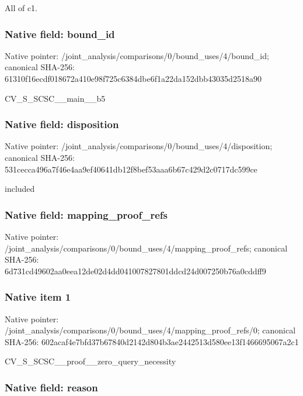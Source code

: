 \documentclass[10pt,a4paper]{article}
\begin{document}
All of c1.


\subsubsection{Native field: bound\_id}


Native pointer: /joint\_analysis/comparis\allowbreak{}ons/0/bound\_uses/4/bound\allowbreak{}\_id; canonical SHA-256: 61310f16ecdf018672a410e9\allowbreak{}8f725c6384dbe6f1a22da152\allowbreak{}dbb43035d2518a90


CV\_S\_SCSC\_\_main\_\_b5


\subsubsection{Native field: disposition}


Native pointer: /joint\_analysis/comparis\allowbreak{}ons/0/bound\_uses/4/dispo\allowbreak{}sition; canonical SHA-256: 531cecca496a7f46e4aa9ef4\allowbreak{}0641db12f8bef53aaa6b67c4\allowbreak{}29d2c0717dc599ce


included


\subsubsection{Native field: mapping\_proof\_refs}


Native pointer: /joint\_analysis/comparis\allowbreak{}ons/0/bound\_uses/4/mappi\allowbreak{}ng\_proof\_refs; canonical SHA-256: 6d731cd49602aa0eea12de02\allowbreak{}d4dd041007827801ddcd24d0\allowbreak{}07250b76a0cddff9



\subsubsection{Native item 1}


Native pointer: /joint\_analysis/comparis\allowbreak{}ons/0/bound\_uses/4/mappi\allowbreak{}ng\_proof\_refs/0; canonical SHA-256: 602acaf4e7bfd37b67840d21\allowbreak{}42d804b3ae2442513d580ee1\allowbreak{}3f1466695067a2c1


CV\_S\_SCSC\_\_proof\_\_zero\_query\_necessity


\subsubsection{Native field: reason}
\end{document}
